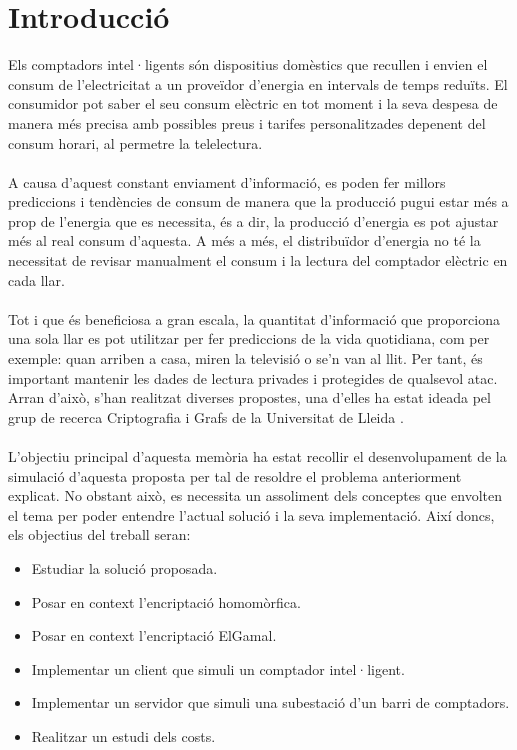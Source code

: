 \documentclass{article}
\begin{document}
\part{Introducció}
Els comptadors intel·ligents són dispositius domèstics que recullen i envien 
el consum de l'electricitat a un proveïdor d’energia en intervals de temps reduïts. El consumidor pot saber el seu consum elèctric en tot moment i la seva despesa de manera més precisa amb possibles preus i tarifes personalitzades depenent del consum horari, al permetre la telelectura.
\\
\\
A causa d'aquest constant enviament d'informació,
es poden fer millors prediccions i tendències de consum de manera que la producció pugui estar més a prop de l'energia que es necessita, és a dir, la producció d'energia es pot ajustar més al real consum d'aquesta. A més a més, el distribuïdor d'energia no té la necessitat de revisar manualment el consum i la lectura del comptador elèctric en cada llar.
\\
\\
Tot i que és beneficiosa a gran escala, la quantitat d'informació que proporciona una sola llar es pot utilitzar per fer prediccions de la vida quotidiana, com per exemple: quan arriben a casa, miren la televisió o se'n van al llit. Per tant, és important mantenir les dades de lectura privades i protegides de qualsevol atac. Arran d'això, s'han realitzat diverses propostes, una d'elles ha estat ideada pel grup de recerca Criptografia i Grafs de la Universitat de Lleida \cite{recsi}.
\\\\
L'objectiu principal d'aquesta memòria ha estat recollir el desenvolupament de la simulació d'aquesta proposta per tal de resoldre el problema anteriorment explicat. No obstant això, es necessita un assoliment dels conceptes que envolten el tema per poder entendre l'actual solució i la seva implementació. Així doncs, els objectius del treball seran:
\begin{itemize}
	\item Estudiar la solució proposada.
	\item Posar en context l'encriptació homomòrfica.
	\item Posar en context l'encriptació ElGamal.
	\item Implementar un client que simuli un comptador intel·ligent.
	\item Implementar un servidor que simuli una subestació d'un barri de comptadors.
	\item Realitzar un estudi dels costs.
\end{itemize}
\end{document}
